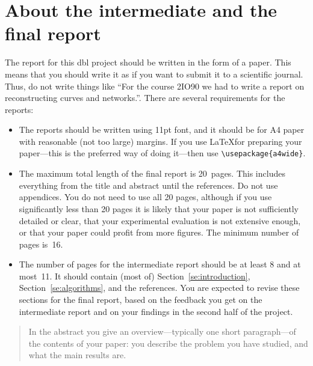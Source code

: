 \documentclass[11pt]{article}
\begin{document}
\section*{About the intermediate and the final report}
The report for this {\sc dbl} project should be written in the form of a paper.
This means that you should write it as if you want to submit it to a scientific
journal. Thus, do not write things like ``For the course 2IO90 we had to write a report
on reconstructing curves and networks.''. There are several requirements for
the reports:
\begin{itemize}
\item The reports should be written using 11\;pt font, and it should be for A4 paper 
      with reasonable (not too large) margins. If you use \LaTeX for preparing
      your paper---this is the preferred way of doing it---then use
      \verb#\usepackage{a4wide}#.
\item The maximum total length of the
      final report is 20~pages. This includes everything from the title and abstract until
      the references. Do not use appendices. You do not need to use all 20 pages,
      although if you use significantly less than 20 pages it is likely that
      your paper is not sufficiently detailed or clear, that your experimental evaluation is
      not extensive enough, or that your paper could profit from more figures.
      The minimum number of pages is~16.
\item The number of pages for the intermediate report should be at least 8 and at most~11.
      It should contain (most of) Section~\ref{se:introduction}, Section~\ref{se:algorithms},
      and the references. You are expected to revise these sections for the final report, based
      on the feedback you get on the intermediate report and on your findings in the second half
      of the project. 
\end{itemize}




\newpage

\maketitle

\begin{abstract}
In the abstract you give an overview---typically one short paragraph---of the contents of
your paper: you describe the problem you have studied, and what the main results are.
\end{abstract}
\end{document}
